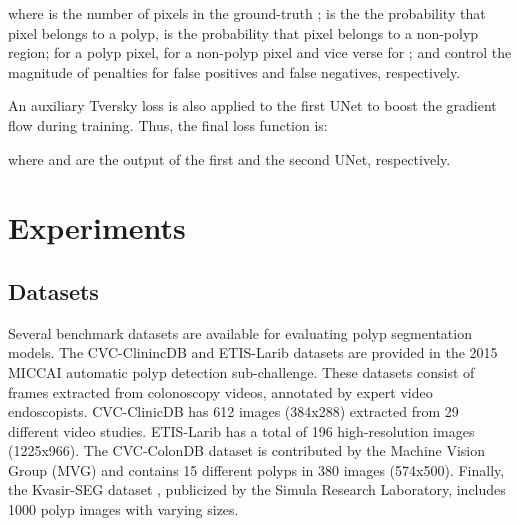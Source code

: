 \documentclass[review, sort&compress]{elsarticle}
\begin{document}
	where  is the number of pixels in the ground-truth ;  is the the probability that pixel  belongs to a polyp,  is the probability that pixel  belongs to a non-polyp region;  for a polyp pixel,  for a non-polyp pixel and vice verse for ;  and  control the magnitude of penalties for false positives and false negatives, respectively.
	
	An auxiliary Tversky loss is also applied to the first UNet to boost the gradient flow during training. Thus, the final loss function is:
	
	where  and  are the output of the first and the second UNet, respectively.
	
	\section{Experiments}
	\label{sec:experiments}
	
	\subsection{Datasets}
	Several benchmark datasets are available for evaluating polyp segmentation models. The CVC-ClinincDB \cite{bernal2015wm} and ETIS-Larib \cite{silva2014toward} datasets are provided in the 2015 MICCAI automatic polyp detection sub-challenge. These datasets consist of frames extracted from colonoscopy videos, annotated by expert video endoscopists. CVC-ClinicDB has 612 images (384x288) extracted from 29 different video studies. ETIS-Larib has a total of 196 high-resolution images (1225x966). The CVC-ColonDB \cite{bernal2012towards} dataset is contributed by the Machine Vision Group (MVG) and contains 15 different polyps in 380 images (574x500). Finally, the Kvasir-SEG dataset \cite{jha2020kvasir}, publicized by the Simula Research Laboratory, includes 1000 polyp images with varying sizes.
	
\end{document}
